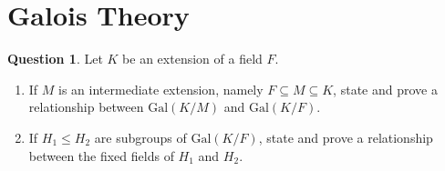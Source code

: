 \documentclass[11pt]{article}
\def\mbb{\mathbb}
\def\R{\mbb{R}}
\theoremstyle{pink}
\theoremstyle{boxedsolution}
\theoremstyle{definition}
\newtheorem{question}{Question}
\theoremstyle{claim}
\newtheorem*{claim}{Claim}
\begin{document}

\newpage

\section*{Galois Theory}

\setcounter{question}{0}

\begin{question}
    Let $K$ be an extension of a field $F$.
    \begin{enumerate}[label=(\alph*)]
        \item If $M$ is an intermediate extension, namely $F \subseteq M \subseteq K$, state and prove a relationship between $\mathrm{Gal}(K/M)$ and $\mathrm{Gal}(K/F)$.

        \item If $H_1 \leq H_2$ are subgroups of $\mathrm{Gal}(K/F)$, state and prove a relationship between the fixed fields of $H_1$ and $H_2$.
    \end{enumerate}
\end{question}
\end{document}
